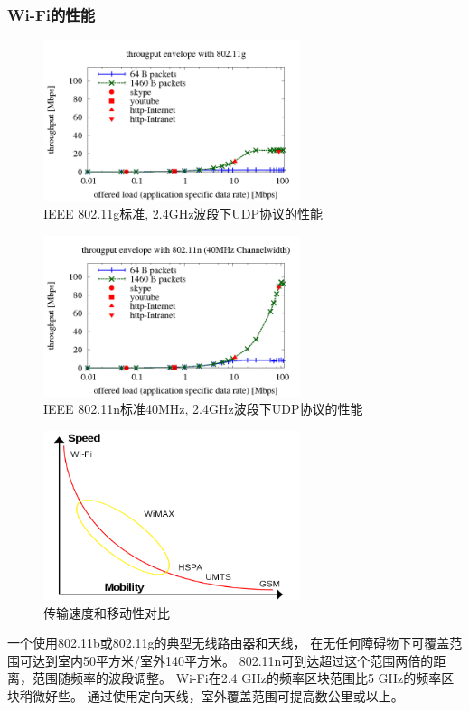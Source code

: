\documentclass[11pt]{article}
\begin{document}
\subsubsection{Wi-Fi的性能}
\begin{figure}[H]
    \begin{center}
    \includegraphics[width=0.67\textwidth]{figures//performance_11g.png}
    \caption{IEEE 802.11g标准, 2.4GHz波段下UDP协议的性能}
    \end{center}
\end{figure}
\begin{figure}[H]
    \begin{center}
    \includegraphics[width=0.67\textwidth]{figures//performance_11n.png}
    \caption{IEEE 802.11n标准40MHz, 2.4GHz波段下UDP协议的性能}
    \end{center}
\end{figure}
\begin{figure}[H]
    \begin{center}
    \includegraphics[width=0.67\textwidth]{figures//wifi_comparison.png}
    \caption{传输速度和移动性对比}
    \end{center}
\end{figure}
一个使用802.11b或802.11g的典型无线路由器和天线，
在无任何障碍物下可覆盖范围可达到室内50平方米/室外140平方米。
802.11n可到达超过这个范围两倍的距离，范围随频率的波段调整。
Wi-Fi在2.4 GHz的频率区块范围比5 GHz的频率区块稍微好些。 通过使用定向天线，室外覆盖范围可提高数公里或以上。
\end{document}
